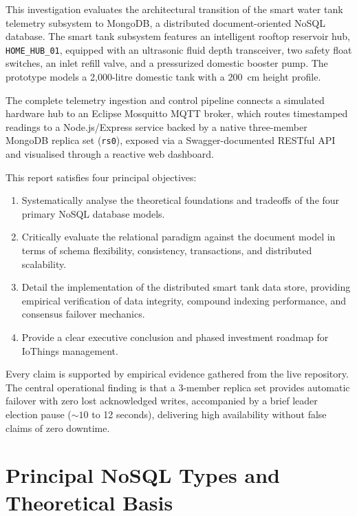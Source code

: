 \documentclass[11pt,a4paper]{article}
\begin{document}
This investigation evaluates the architectural transition of the smart water tank telemetry subsystem to MongoDB, a distributed document-oriented NoSQL database. The smart tank subsystem features an intelligent rooftop reservoir hub, \texttt{HOME\_HUB\_01}, equipped with an ultrasonic fluid depth transceiver, two safety float switches, an inlet refill valve, and a pressurized domestic booster pump. The prototype models a 2,000-litre domestic tank with a 200~cm height profile.

The complete telemetry ingestion and control pipeline connects a simulated hardware hub to an Eclipse Mosquitto MQTT broker, which routes timestamped readings to a Node.js/Express service backed by a native three-member MongoDB replica set (\texttt{rs0}), exposed via a Swagger-documented RESTful API and visualised through a reactive web dashboard.

This report satisfies four principal objectives:
\begin{enumerate}[noitemsep]
\item Systematically analyse the theoretical foundations and tradeoffs of the four primary NoSQL database models.
\item Critically evaluate the relational paradigm against the document model in terms of schema flexibility, consistency, transactions, and distributed scalability.
\item Detail the implementation of the distributed smart tank data store, providing empirical verification of data integrity, compound indexing performance, and consensus failover mechanics.
\item Provide a clear executive conclusion and phased investment roadmap for IoThings management.
\end{enumerate}

Every claim is supported by empirical evidence gathered from the live repository. The central operational finding is that a 3-member replica set provides automatic failover with zero lost acknowledged writes, accompanied by a brief leader election pause ($\sim 10$ to 12 seconds), delivering high availability without false claims of zero downtime.

\section{Principal NoSQL Types and Theoretical Basis}
\end{document}
